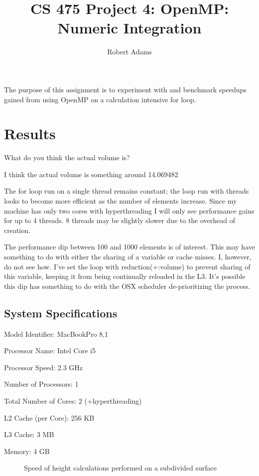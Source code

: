 \documentclass[letterpaper,10pt]{article} %
\begin{document}
\title{CS 475 Project 4: OpenMP: Numeric Integration} 
\author{Robert Adams}
\maketitle


The purpose of this assignment is to experiment with and benchmark speedups gained from using OpenMP on a calculation intensive for loop.


\section{Results}

What do you think the actual volume is?

I think the actual volume is something around 14.069482




The for loop run on a single thread remains constant; the loop run with threads looks to become more efficient as the number of elements increase. Since my machine has only two cores with hyperthreading I will only see performance gains for up to 4 threads. 8 threads may be slightly slower due to the overhead of creation. 



	The performance dip between 100 and 1000 elements is of interest. This may have something to do with either the sharing of a variable or cache misses. I, however, do not see how.  I’ve set the loop with reduction(+:volume) to prevent sharing of this variable, keeping it from being continually reloaded in the L3. It’s possible this dip has something to do with the OSX scheduler de-prioritizing the process.
  
  
  \subsection{System Specifications}

Model Identifier: MacBookPro 8,1

Processor Name: Intel Core i5

Processor Speed: 2.3 GHz

Number of Processors: 1

Total Number of Cores: 2 (+hyperthreading)

L2 Cache (per Core): 256 KB

L3 Cache: 3 MB

Memory: 4 GB

\begin{figure} [ht]
    \centering
    
	\caption{Speed of height calculations performed on a subdivided surface} 
    \label{runtimes}
\end{figure}

\end{document}
